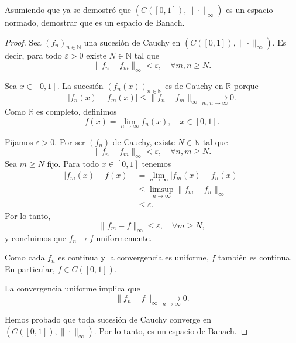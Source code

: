 \begin{exercise}
    Asumiendo que ya se demostró que $(C([0, 1]), \| \cdot \|_{\infty})$ es un espacio normado, demostrar que es un espacio de Banach.
\end{exercise}

\begin{proof}
    Sea $(f_n)_{n \in \mathbb{N}}$ una sucesión de Cauchy en $(C([0, 1]), \| \cdot \|_{\infty})$. 
    Es decir, para todo $\varepsilon > 0$ existe $N \in \mathbb{N}$ tal que
    \begin{equation*}
        \| f_n - f_m \|_{\infty} < \varepsilon, \quad \forall m,n \ge N.
    \end{equation*}

    Sea $x \in [0,1]$. La sucesión $(f_n(x))_{n \in \mathbb{N}}$ es de Cauchy en $\mathbb{R}$ porque
    \begin{equation*}
        |f_n(x) - f_m(x)| \leq \| f_n - f_m \|_{\infty} \xrightarrow[m,n\to\infty]{} 0.
    \end{equation*}
    Como $\mathbb{R}$ es completo, definimos
    \begin{equation*}
        f(x) = \lim_{n \to \infty} f_n(x), \quad x \in [0,1].
    \end{equation*}

    Fijamos $\varepsilon>0$. Por ser $(f_n)$ de Cauchy, existe $N\in\mathbb{N}$ tal que
    \begin{equation*}
        \| f_n - f_m \|_{\infty} < \varepsilon, \quad \forall n,m \ge N.
    \end{equation*}
    Sea $m \ge N$ fijo. Para todo $x \in [0,1]$ tenemos
    \begin{align*}
        |f_m(x) - f(x)| 
        &= \lim_{n \to \infty} | f_m(x) - f_n(x) | \\
        &\le \limsup_{n \to \infty} \| f_m - f_n \|_{\infty} \\
        &\le \varepsilon.
    \end{align*}
    Por lo tanto,
    \begin{equation*}
        \| f_m - f \|_{\infty} \le \varepsilon, \quad \forall m \ge N,
    \end{equation*}
    y concluimos que $f_n \to f$ uniformemente.

    Como cada $f_n$ es continua y la convergencia es uniforme, $f$ también es continua.  
    En particular, $f \in C([0,1])$.

    La convergencia uniforme implica que
    \begin{equation*}
        \| f_n - f \|_{\infty} \xrightarrow[n \to \infty]{} 0.
    \end{equation*}

    Hemos probado que toda sucesión de Cauchy converge en $(C([0,1]), \| \cdot \|_\infty)$.
    Por lo tanto, es un espacio de Banach.
\end{proof}

